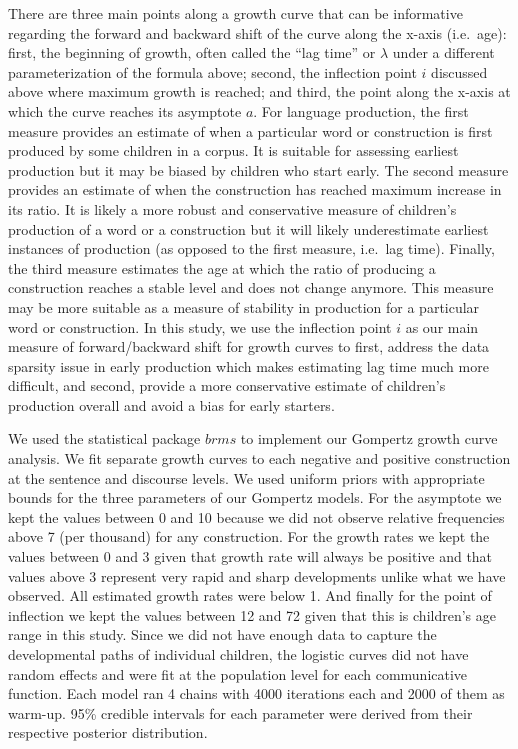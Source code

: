 \documentclass[
  man,floatsintext]{apa6}
\begin{document}
There are three main points along a growth curve that can be informative regarding the forward and backward shift of the curve along the x-axis (i.e.~age): first, the beginning of growth, often called the ``lag time'' or \(\lambda\) under a different parameterization of the formula above; second, the inflection point \(i\) discussed above where maximum growth is reached; and third, the point along the x-axis at which the curve reaches its asymptote \(a\). For language production, the first measure provides an estimate of when a particular word or construction is first produced by some children in a corpus. It is suitable for assessing earliest production but it may be biased by children who start early. The second measure provides an estimate of when the construction has reached maximum increase in its ratio. It is likely a more robust and conservative measure of children's production of a word or a construction but it will likely underestimate earliest instances of production (as opposed to the first measure, i.e.~lag time). Finally, the third measure estimates the age at which the ratio of producing a construction reaches a stable level and does not change anymore. This measure may be more suitable as a measure of stability in production for a particular word or construction. In this study, we use the inflection point \(i\) as our main measure of forward/backward shift for growth curves to first, address the data sparsity issue in early production which makes estimating lag time much more difficult, and second, provide a more conservative estimate of children's production overall and avoid a bias for early starters.

We used the statistical package \(brms\) to implement our Gompertz growth curve analysis. We fit separate growth curves to each negative and positive construction at the sentence and discourse levels. We used uniform priors with appropriate bounds for the three parameters of our Gompertz models. For the asymptote we kept the values between 0 and 10 because we did not observe relative frequencies above 7 (per thousand) for any construction. For the growth rates we kept the values between 0 and 3 given that growth rate will always be positive and that values above 3 represent very rapid and sharp developments unlike what we have observed. All estimated growth rates were below 1. And finally for the point of inflection we kept the values between 12 and 72 given that this is children's age range in this study. Since we did not have enough data to capture the developmental paths of individual children, the logistic curves did not have random effects and were fit at the population level for each communicative function. Each model ran 4 chains with 4000 iterations each and 2000 of them as warm-up. 95\% credible intervals for each parameter were derived from their respective posterior distribution.
\end{document}
